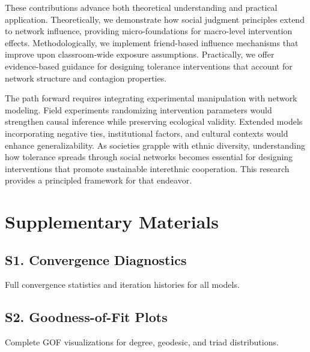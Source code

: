 \documentclass[12pt,a4paper]{article}
\begin{document}
These contributions advance both theoretical understanding and practical application. Theoretically, we demonstrate how social judgment principles extend to network influence, providing micro-foundations for macro-level intervention effects. Methodologically, we implement friend-based influence mechanisms that improve upon classroom-wide exposure assumptions. Practically, we offer evidence-based guidance for designing tolerance interventions that account for network structure and contagion properties.

The path forward requires integrating experimental manipulation with network modeling. Field experiments randomizing intervention parameters would strengthen causal inference while preserving ecological validity. Extended models incorporating negative ties, institutional factors, and cultural contexts would enhance generalizability. As societies grapple with ethnic diversity, understanding how tolerance spreads through social networks becomes essential for designing interventions that promote sustainable interethnic cooperation. This research provides a principled framework for that endeavor.






\newpage
\section*{Supplementary Materials}

\subsection*{S1. Convergence Diagnostics}

Full convergence statistics and iteration histories for all models.

\subsection*{S2. Goodness-of-Fit Plots}

Complete GOF visualizations for degree, geodesic, and triad distributions.
\end{document}
